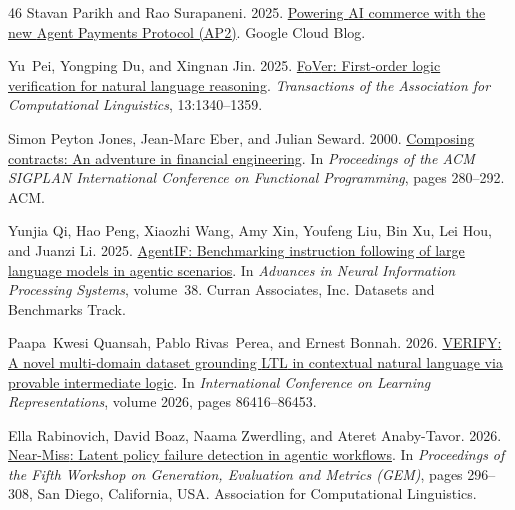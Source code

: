 \documentclass[11pt]{article}
\begin{document}
\begin{thebibliography}{46}
Stavan Parikh and Rao Surapaneni. 2025.
\newblock \href {https://cloud.google.com/blog/products/ai-machine-learning/announcing-agents-to-payments-ap2-protocol} {Powering {AI} commerce with the new {Agent Payments Protocol (AP2)}}.
\newblock Google Cloud Blog.

Yu~Pei, Yongping Du, and Xingnan Jin. 2025.
\newblock \href {https://doi.org/10.1162/tacl.a.41} {{F}o{V}er: First-order logic verification for natural language reasoning}.
\newblock \emph{Transactions of the Association for Computational Linguistics}, 13:1340--1359.

Simon {Peyton Jones}, Jean-Marc Eber, and Julian Seward. 2000.
\newblock \href {https://www.microsoft.com/en-us/research/publication/composing-contracts-an-adventure-in-financial-engineering/} {Composing contracts: An adventure in financial engineering}.
\newblock In \emph{Proceedings of the ACM SIGPLAN International Conference on Functional Programming}, pages 280--292. ACM.

Yunjia Qi, Hao Peng, Xiaozhi Wang, Amy Xin, Youfeng Liu, Bin Xu, Lei Hou, and Juanzi Li. 2025.
\newblock \href {https://doi.org/10.52202/085713-1892} {{AgentIF}: Benchmarking instruction following of large language models in agentic scenarios}.
\newblock In \emph{Advances in Neural Information Processing Systems}, volume~38. Curran Associates, Inc.
\newblock Datasets and Benchmarks Track.

Paapa~Kwesi Quansah, Pablo Rivas~Perea, and Ernest Bonnah. 2026.
\newblock \href {https://proceedings.iclr.cc/paper_files/paper/2026/file/8b078da44614b6e249dc9e9474dc8d11-Paper-Conference.pdf} {{VERIFY}: A novel multi-domain dataset grounding {LTL} in contextual natural language via provable intermediate logic}.
\newblock In \emph{International Conference on Learning Representations}, volume 2026, pages 86416--86453.

Ella Rabinovich, David Boaz, Naama Zwerdling, and Ateret Anaby-Tavor. 2026.
\newblock \href {https://doi.org/10.18653/v1/2026.gem-main.30} {{Near-Miss}: Latent policy failure detection in agentic workflows}.
\newblock In \emph{Proceedings of the Fifth Workshop on Generation, Evaluation and Metrics ({GEM})}, pages 296--308, San Diego, California, USA. Association for Computational Linguistics.


\end{thebibliography}
\end{document}
